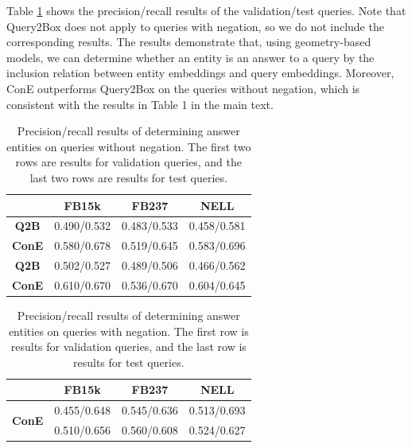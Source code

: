 \documentclass{article}
\begin{document}
Table \ref{tab:answer_epfo} shows the precision/recall results of the validation/test queries. Note that Query2Box does not apply to queries with negation, so we do not include the corresponding results. The results demonstrate that, using geometry-based models, we can determine whether an entity is an answer to a query by the inclusion relation between entity embeddings and query embeddings. Moreover, ConE outperforms Query2Box on the queries without negation, which is consistent with the results in Table 1 in the main text.
\begin{table}[ht]
    \centering
    \caption{Precision/recall results of determining answer entities on queries without negation. The first two rows are results for validation queries, and the last two rows are results for test queries.}
    \label{tab:answer_epfo}
    \vspace{1mm}
    \begin{tabular}{cccc}
    \toprule
        & \textbf{FB15k} &\textbf{FB237} & \textbf{NELL}\\
        \midrule
        \textbf{Q2B} & 0.490/0.532 &0.483/0.533 &0.458/0.581 \\
        \textbf{ConE} & 	0.580/0.678	&0.519/0.645 &0.583/0.696\\
        \midrule
        \textbf{Q2B} & 0.502/0.527	&0.489/0.506	&0.466/0.562 \\
        \textbf{ConE} &0.610/0.670	&0.536/0.670	&0.604/0.645\\
    \bottomrule
    \end{tabular}
\end{table}

\begin{table}[ht]
    \centering
    \caption{Precision/recall results of determining answer entities on queries with negation. The first row is results for validation queries, and the last row is results for test queries.}
    \label{tab:answer_neg}
    \vspace{1mm}
    \begin{tabular}{cccc}
    \toprule
        & \textbf{FB15k} &\textbf{FB237} & \textbf{NELL}\\
        \midrule
        \multirow{2}{*}{\textbf{ConE}} & 	0.455/0.648	&0.545/0.636	&0.513/0.693\\
        &0.510/0.656	&0.560/0.608	&0.524/0.627\\
    \bottomrule
    \end{tabular}
\end{table}
\end{document}
